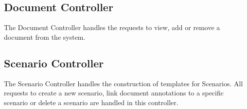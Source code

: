 \subsection{Document Controller}
The Document Controller handles the requests to view, add or remove a document from the system.

\subsection{Scenario Controller}
The Scenario Controller handles the construction of templates for Scenarios. All requests to create a new scenario, link document annotations to a specific scenario or delete a scenario are handled in this controller.




